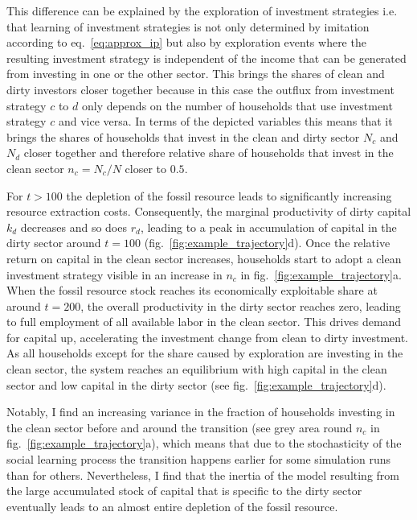 This difference can be explained by the exploration of investment strategies i.e. that learning of investment strategies is not only determined by imitation according to eq.~\eqref{eq:approx_ip} but also by exploration events where the resulting investment strategy is independent of the income that can be generated from investing in one or the other sector. This brings the shares of clean and dirty investors closer together because in this case the outflux from investment strategy $c$ to $d$ only depends on the number of households that use investment strategy $c$ and vice versa. In terms of the depicted variables this means that it brings the shares of households that invest in the clean and dirty sector $N_c$ and $N_d$ closer together and therefore relative share of households that invest in the clean sector $n_c=N_c/N$ closer to $0.5$. 

For $t>100$ the depletion of the fossil resource leads to significantly increasing resource extraction costs. Consequently, the marginal productivity of dirty capital $k_d$ decreases and so does $r_d$, leading to a peak in accumulation of capital in the dirty sector around $t=100$ (fig.~\ref{fig:example_trajectory}d).
Once the relative return on capital in the clean sector increases, households start to adopt a clean investment strategy visible in an increase in $n_c$ in fig.~\ref{fig:example_trajectory}a.
When the fossil resource stock reaches its economically exploitable share at around $t=200$, the overall productivity in the dirty sector reaches zero, leading to full employment of all available labor in the clean sector.
This drives demand for capital up, accelerating the investment change from clean to dirty investment.
As all households except for the share caused by exploration are investing in the clean sector, the system reaches an equilibrium with high capital in the clean sector and low capital in the dirty sector (see fig.~\ref{fig:example_trajectory}d).

Notably, I find an increasing variance in the fraction of households investing in the clean sector before and around the transition (see grey area round $n_c$ in fig.~\ref{fig:example_trajectory}a), which means that due to the stochasticity of the social learning process the transition happens earlier for some simulation runs than for others. Nevertheless, I find that the inertia of the model resulting from the large accumulated stock of capital that is specific to the dirty sector eventually leads to an almost entire depletion of the fossil resource.


